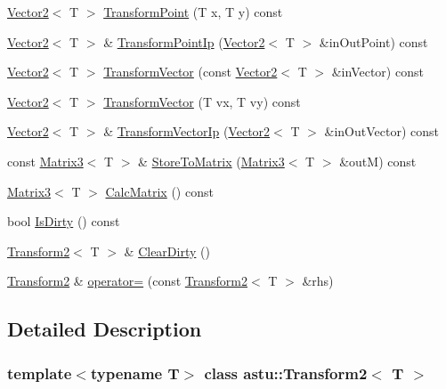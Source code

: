 \begin{DoxyCompactItemize}
\item 
\hyperlink{classastu_1_1Vector2}{Vector2}$<$ T $>$ \hyperlink{classastu_1_1Transform2_acc9adb55663a9fbf8ee13cc04cc74076}{Transform\+Point} (T x, T y) const
\item 
\hyperlink{classastu_1_1Vector2}{Vector2}$<$ T $>$ \& \hyperlink{classastu_1_1Transform2_a11e7876512ee6946c70ea592f5632825}{Transform\+Point\+Ip} (\hyperlink{classastu_1_1Vector2}{Vector2}$<$ T $>$ \&in\+Out\+Point) const
\item 
\hyperlink{classastu_1_1Vector2}{Vector2}$<$ T $>$ \hyperlink{classastu_1_1Transform2_a5cbc516d49e296f867e239db4a37b82b}{Transform\+Vector} (const \hyperlink{classastu_1_1Vector2}{Vector2}$<$ T $>$ \&in\+Vector) const
\item 
\hyperlink{classastu_1_1Vector2}{Vector2}$<$ T $>$ \hyperlink{classastu_1_1Transform2_a7e27416f3aacb3cf93fccfcefb4da24c}{Transform\+Vector} (T vx, T vy) const
\item 
\hyperlink{classastu_1_1Vector2}{Vector2}$<$ T $>$ \& \hyperlink{classastu_1_1Transform2_ab83170522e82b2cd83f3889976dae6b1}{Transform\+Vector\+Ip} (\hyperlink{classastu_1_1Vector2}{Vector2}$<$ T $>$ \&in\+Out\+Vector) const
\item 
const \hyperlink{classastu_1_1Matrix3}{Matrix3}$<$ T $>$ \& \hyperlink{classastu_1_1Transform2_aaab63ef60cf3abd49315d778c7f3eecd}{Store\+To\+Matrix} (\hyperlink{classastu_1_1Matrix3}{Matrix3}$<$ T $>$ \&outM) const
\item 
\hyperlink{classastu_1_1Matrix3}{Matrix3}$<$ T $>$ \hyperlink{classastu_1_1Transform2_a7fabb3752ecd13f0e83f9e0218dc4295}{Calc\+Matrix} () const
\item 
bool \hyperlink{classastu_1_1Transform2_a935f5e7fb268157b770fc315c7c660ea}{Is\+Dirty} () const
\item 
\hyperlink{classastu_1_1Transform2}{Transform2}$<$ T $>$ \& \hyperlink{classastu_1_1Transform2_afbd879828c3b5de8767be64e11fc79ec}{Clear\+Dirty} ()
\item 
\hyperlink{classastu_1_1Transform2}{Transform2} \& \hyperlink{classastu_1_1Transform2_a486d9255c074d2e96c8302f5e2c1da53}{operator=} (const \hyperlink{classastu_1_1Transform2}{Transform2}$<$ T $>$ \&rhs)
\end{DoxyCompactItemize}


\subsection{Detailed Description}
\subsubsection*{template$<$typename T$>$\newline
class astu\+::\+Transform2$<$ T $>$}

